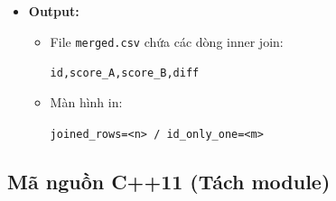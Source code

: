 \begin{itemize}
    \item \textbf{Output:}
    \begin{itemize}
        \item File \texttt{merged.csv} chứa các dòng inner join:
        \begin{center}
            \texttt{id,score\_A,score\_B,diff}
        \end{center}
        \item Màn hình in:
        \begin{center}
            \texttt{joined\_rows=<n> / id\_only\_one=<m>}
        \end{center}
    \end{itemize}
\end{itemize}

\subsection{Mã nguồn C++11 (Tách module)}
